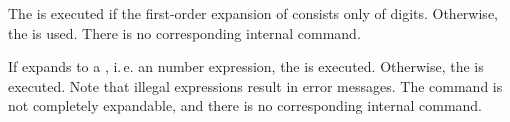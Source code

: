 \begin{Declaration}
\end{Declaration}
The  is executed if
the first-order expansion of  consists only of
digits. Otherwise, the  is used. There is no
corresponding internal command.
%
\EndIndexGroup


\begin{Declaration}
\end{Declaration}
If
 expands to a , i.\,e. an \eTeX{} number
expression, the  is executed. Otherwise, the  is executed.  Note that illegal expressions
result in error messages. The command is not completely expandable, and
there is no corresponding internal command.%
\EndIndexGroup


